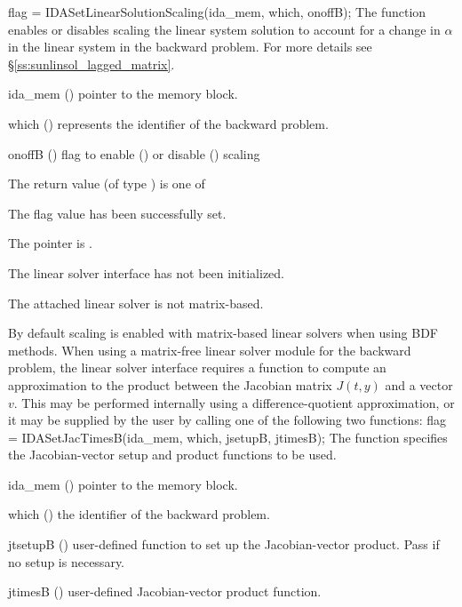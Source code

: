 {
  flag = IDASetLinearSolutionScaling(ida\_mem, which, onoffB);
}
{
  The function  enables or disables scaling
  the linear system solution to account for a change in $\alpha$ in the linear
  system in the backward problem. For more details see
  \S\ref{ss:sunlinsol_lagged_matrix}.
}
{
  \begin{args}
  \item[ida\_mem] ()
    pointer to the {\idas} memory block.
  \item[which] ()
    represents the identifier of the backward problem.
  \item[onoffB] ()
    flag to enable () or disable () scaling
  \end{args}
}
{
  The return value  (of type ) is one of
  \begin{args}
  \item[\Id{IDALS\_SUCCESS}]
    The flag value has been successfully set.
  \item[\Id{IDALS\_MEM\_NULL}]
    The  pointer is .
  \item[\Id{IDALS\_LMEM\_NULL}]
    The {\idals} linear solver interface has not been initialized.
  \item[\Id{IDALS\_ILL\_INPUT}]
    The attached linear solver is not matrix-based.
  \end{args}
}
{
  By default scaling is enabled with matrix-based linear solvers when using BDF
  methods.
}
When using a matrix-free linear solver module for the backward
problem, the {\idals} linear solver interface requires a function to
compute an approximation to the product between the Jacobian matrix
$J(t,y)$ and a vector $v$.  This may be performed internally using a
difference-quotient approximation, or it may be supplied by the user
by calling one of the following two functions:
{
  flag = IDASetJacTimesB(ida\_mem, which, jsetupB, jtimesB);
}
{
  The function  specifies the Jacobian-vector
  setup and product functions to be used.
}
{
  \begin{args}
  \item[ida\_mem] ()
    pointer to the {\idas} memory block.
  \item[which] ()
    the identifier of the backward problem.
  \item[jtsetupB] ()
    user-defined function to set up the Jacobian-vector product.
    Pass  if no setup is necessary.
  \item[jtimesB] ()
    user-defined Jacobian-vector product function.
  \end{args}
}
